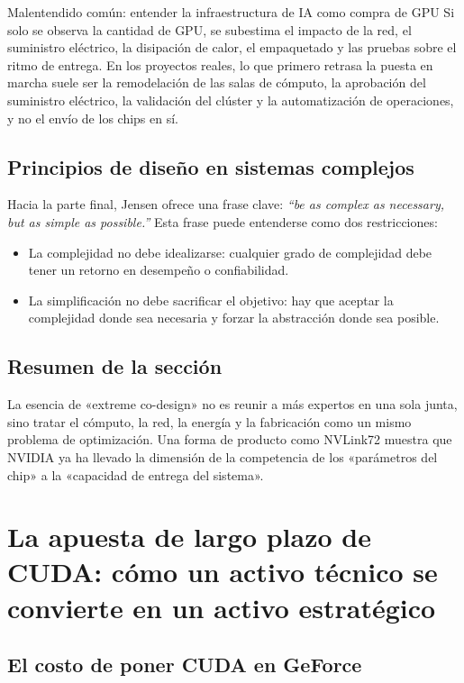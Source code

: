\documentclass[a4paper]{article}
\begin{document}
\begin{warningbox}{Malentendido común: entender la infraestructura de IA como compra de GPU}
Si solo se observa la cantidad de GPU, se subestima el impacto de la red, el suministro eléctrico, la disipación de calor, el empaquetado y las pruebas sobre el ritmo de entrega. En los proyectos reales, lo que primero retrasa la puesta en marcha suele ser la remodelación de las salas de cómputo, la aprobación del suministro eléctrico, la validación del clúster y la automatización de operaciones, y no el envío de los chips en sí.
\end{warningbox}

\subsection{Principios de diseño en sistemas complejos}

Hacia la parte final, Jensen ofrece una frase clave: \textit{``be as complex as necessary, but as simple as possible.''} Esta frase puede entenderse como dos restricciones:
\begin{itemize}
    \item La complejidad no debe idealizarse: cualquier grado de complejidad debe tener un retorno en desempeño o confiabilidad.
    \item La simplificación no debe sacrificar el objetivo: hay que aceptar la complejidad donde sea necesaria y forzar la abstracción donde sea posible.
\end{itemize}

\subsection{Resumen de la sección}

La esencia de «extreme co-design» no es reunir a más expertos en una sola junta, sino tratar el cómputo, la red, la energía y la fabricación como un mismo problema de optimización. Una forma de producto como NVLink72 muestra que NVIDIA ya ha llevado la dimensión de la competencia de los «parámetros del chip» a la «capacidad de entrega del sistema».

\section{La apuesta de largo plazo de CUDA: cómo un activo técnico se convierte en un activo estratégico}

\subsection{El costo de poner CUDA en GeForce}
\end{document}
